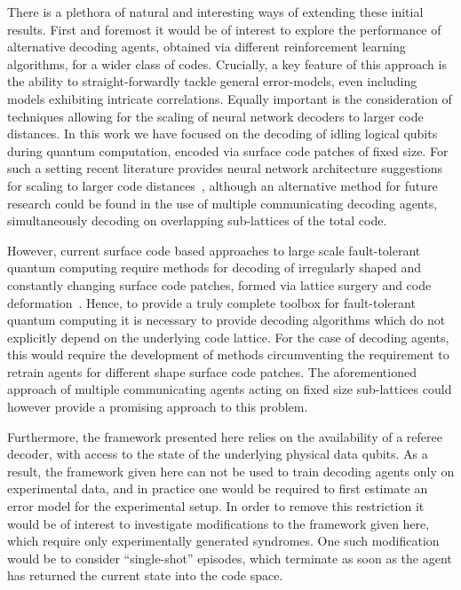 \documentclass[twocolumn,preprintnumbers,amsmath,amssymb,notitlepage,nofootinbib,longbibliography,superscriptaddress,aps,pra,10pt]{revtex4-1}
\begin{document}
	There is a plethora of natural and interesting ways of extending these initial results.
	First and foremost it would be of interest to explore the performance of alternative decoding agents, obtained via different reinforcement learning algorithms, for a wider class of codes.
	Crucially, a key feature of this approach is the ability to straight-forwardly tackle general error-models, even including models exhibiting intricate correlations.
	Equally important is the consideration of techniques allowing for the scaling of neural network decoders to larger code distances.
	In this work we have focused on the decoding of idling logical qubits during quantum computation, encoded via surface code patches of fixed size.
	For such a setting recent literature provides neural network architecture suggestions for scaling to larger code distances~\cite{Ni18}, although an alternative method for future research could be found in the use of multiple communicating decoding agents, simultaneously decoding on overlapping sub-lattices of the total code.

	However, current surface code based approaches to large scale fault-tolerant quantum computing 
	require methods for decoding of irregularly shaped and constantly changing surface code patches, 
	formed via lattice surgery and code deformation~\cite{Litinski18b,Fowler18}.
	Hence, to provide a truly complete toolbox for fault-tolerant quantum computing it is necessary to provide 
	decoding algorithms which do not explicitly depend on the underlying code lattice.
	For the case of decoding agents, this would require the development of methods circumventing the requirement to retrain agents for different shape surface code patches.
	The aforementioned approach of multiple communicating agents acting on fixed size sub-lattices could however provide a promising approach to this problem.

	Furthermore, the framework presented here relies on the availability of a referee decoder, with access to the state of the underlying physical data qubits.
	As a result, the framework given here can not be used to train decoding agents only on experimental data, and in practice one would be required to first estimate an error model for the experimental setup.
	In order to remove this restriction it would be of interest to investigate modifications to the framework given here, which require only experimentally generated syndromes.
	One such modification would be to consider ``single-shot'' episodes, which terminate as soon as the agent has returned the current state into the code space.
\end{document}
